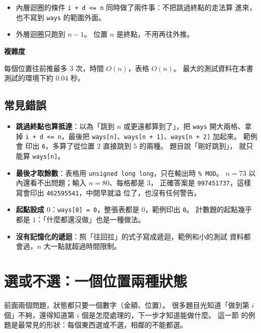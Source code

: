 
\begin{itemize}
\item 內層迴圈的條件 \texttt{i + d <= n} 同時做了兩件事：不把跳過終點的走法算
進來，也不寫到 \texttt{ways} 的範圍外面。
\item 外層迴圈只跑到 $n - 1$。 位置 $n$ 是終點，不用再往外推。
\end{itemize}

\textbf{複雜度}

每個位置往前推最多 $3$ 次，時間 $O(n)$，表格 $O(n)$。 最大的測試資料在本書
測試的環境下約 $0.04$ 秒。

\subsection{常見錯誤}

\begin{itemize}
\item \textbf{跳過終點也算抵達}：以為「跳到 $n$ 或更遠都算到了」，把
\texttt{ways} 開大兩格、拿掉 \texttt{i + d <= n}，最後把
\texttt{ways[n]}、\texttt{ways[n + 1]}、\texttt{ways[n + 2]} 加起來。 範例會
印出 \texttt{6}，多算了從位置 $2$ 直接跳到 $5$ 的兩種。 題目說「剛好跳到」，
就只能算 \texttt{ways[n]}。
\item \textbf{最後才取餘數}：表格用 \texttt{unsigned long long}，只在輸出時
\texttt{\% MOD}。 $n = 73$ 以內還看不出問題；輸入 $n = 80$、每格都是 $3$，
正確答案是 \texttt{997451737}，這樣寫會印出 \texttt{462595541}，中間早就溢
位了，也沒有任何警告。
\item \textbf{起點設成 $0$}：\texttt{ways[0] = 0}，整張表都是 $0$，範例印出
\texttt{0}。 計數題的起點幾乎都是 $1$：「什麼都還沒做」也是一種做法。
\item \textbf{沒有記憶化的遞迴}：照「往回拉」的式子寫成遞迴，範例和小的測試
資料都會過，$n$ 大一點就超過時間限制。
\end{itemize}

\section{選或不選：一個位置兩種狀態}
\label{sec:dp1-two}

前面兩個問題，狀態都只要一個數字（金額、位置）。 很多題目光知道「做到第
$i$ 個」不夠，還得知道第 $i$ 個是怎麼處理的，下一步才知道能做什麼。 這一節
的例題是最常見的形狀：每個東西選或不選，相鄰的不能都選。

